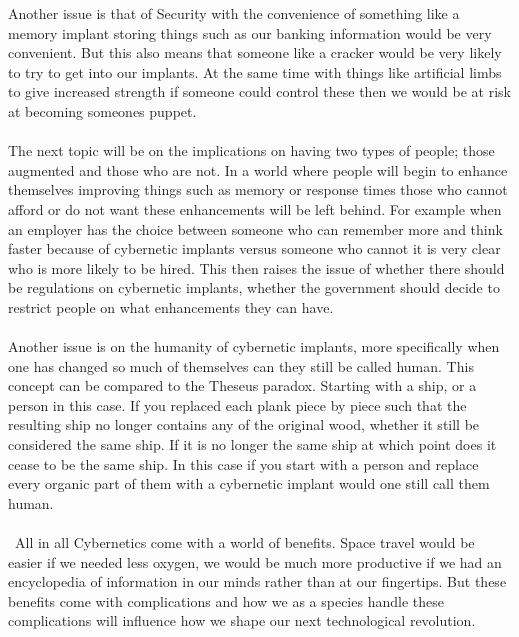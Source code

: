 \documentclass[12pt,a4paper,notitlepage]{article}
\begin{document}
    Another issue is that of Security with the convenience of something like a
memory implant storing things such as our banking information would be very
convenient. But this also means that someone like a cracker would be very likely
to try to get into our implants. At the same time with things like artificial
limbs to give increased strength if someone could control these then we would be
at risk at becoming someones puppet.
\\\\
    The next topic will be on the implications on having two types of people;
those augmented and those who are not. In a world where people will begin to
enhance themselves improving things such as memory or response times those who
cannot afford or do not want these enhancements will be left behind. For
example when an employer has the choice between someone who can remember more 
and think faster because of cybernetic implants versus someone who cannot it is
very clear who is more likely to be hired. This then raises the issue of whether
there should be regulations on cybernetic implants, whether the government
should decide to restrict people on what enhancements they can have. 
\\\\
    Another issue is on the humanity of cybernetic implants, more specifically
when one has changed so much of themselves can they still be called human. This
concept can be compared to the Theseus paradox. Starting with a ship, or a
person in this case. If you replaced each plank piece by piece such that the
resulting ship no longer contains any of the original wood, whether it still be
considered the same ship. If it is no longer the same ship at which point does
it cease to be the same ship. In this case if you start with a person and
replace every organic part of them with a cybernetic implant would one still
call them human.
\\\\\
    All in all Cybernetics come with a world of benefits. Space travel would be
easier if we needed less oxygen, we would be much more productive if we had an
encyclopedia of information in our minds rather than at our fingertips. But
these benefits come with complications and how we as a species handle these
complications will influence how we shape our next technological revolution.
\newpage
\end{document}
